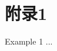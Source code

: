 \documentclass[a4paper, oneside, openany, extrafontsizes]{dlutthesis}
\begin{document}
\maketitle

\cleardoublepage


\frontmatter

\cleardoublepage



\cleardoublepage
\tableofcontents*

\mainmatter






\printpagenotes


\renewcommand\bibname{参~考~文~献}



\appendix
\chapter{附录1}{Example 1}
...

\backmatter
\end{document}
